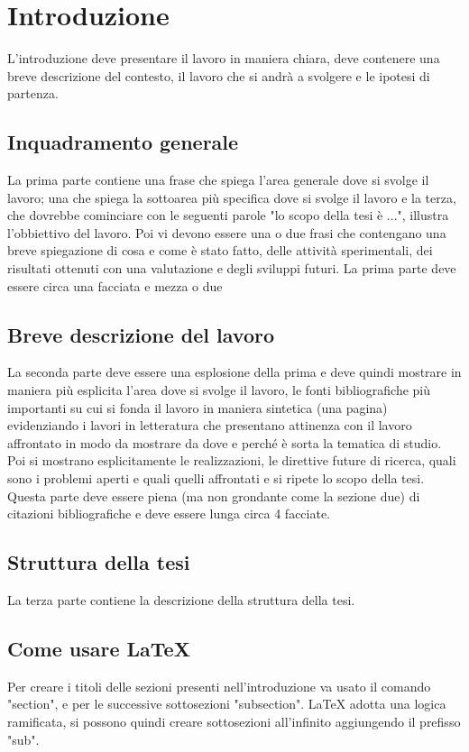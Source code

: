 \chapter{Introduzione}
\label{Introduzione}

L'introduzione deve presentare il lavoro in maniera chiara, deve contenere una breve descrizione del contesto, il lavoro che si andrà a svolgere e le ipotesi di partenza. 

\section{Inquadramento generale}
La prima parte contiene una frase che spiega l'area generale dove si svolge il lavoro; una che spiega la sottoarea più specifica dove si svolge il lavoro e la terza, che dovrebbe cominciare con le seguenti parole "lo scopo della tesi è ...", illustra l'obbiettivo del lavoro. Poi vi devono essere una o due frasi che contengano una breve spiegazione di cosa e come è stato fatto, delle attività sperimentali, dei risultati ottenuti con una valutazione e degli sviluppi futuri. La prima parte deve essere circa una facciata e mezza o due

\section{Breve descrizione del lavoro}
La seconda parte deve essere una esplosione della prima e deve quindi mostrare in maniera più esplicita l'area dove si svolge il lavoro, le fonti bibliografiche più importanti su cui si fonda il lavoro in maniera sintetica (una pagina) evidenziando i lavori in letteratura che presentano attinenza con il lavoro affrontato in modo da mostrare da dove e perché è sorta la tematica di studio. Poi si mostrano esplicitamente le realizzazioni, le direttive future di ricerca, quali sono i problemi aperti e quali quelli affrontati e si ripete lo scopo della tesi. Questa parte deve essere piena (ma non grondante come la sezione due) di citazioni bibliografiche e deve essere lunga circa 4 facciate.

\section{Struttura della tesi}
La terza parte contiene la descrizione della struttura della tesi.

\section{Come usare LaTeX}
Per creare i titoli delle sezioni presenti nell'introduzione va usato il comando "section", e per le successive sottosezioni "subsection". LaTeX adotta una logica ramificata, si possono quindi creare sottosezioni all'infinito aggiungendo il prefisso "sub".

